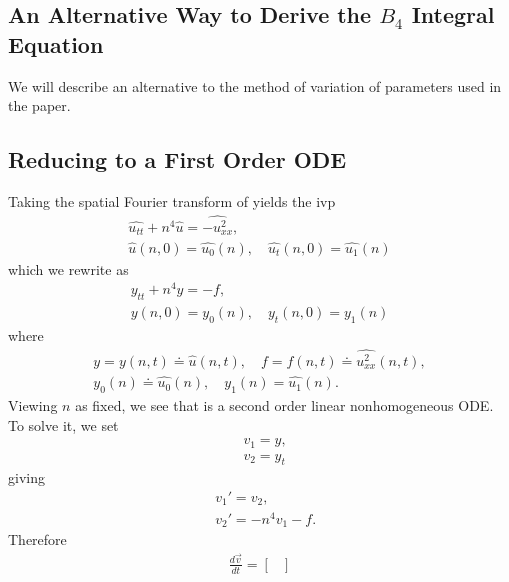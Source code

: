 \documentclass[12pt,reqno]{amsart}
\numberwithin{equation}{section}  %
\renewcommand{\cref}{\Cref}
\newcommand{\wh}{\widehat}
\begin{document}
\begin{appendices}
\section{An Alternative Way to Derive the $B_{4}$ Integral Equation}
\label{ssec:integral-form-deriv}
We will describe an alternative to the method of variation of parameters used in
the paper. 
%
%
\subsection{Reducing to a First Order ODE} 
\label{ssec:first-order-ode}
Taking the spatial Fourier transform of \cref{lin-mb} yields
the ivp
%
%
\begin{gather*}
  \wh{u_{tt}} + n^{4} \wh{u} = \wh{-u^{2}_{xx}},
  \\
  \wh{u}(n, 0) = \wh{u_{0}}(n), \quad \wh{u_{t}}(n, 0) = \wh{u_{1}}(n)
\end{gather*}
%
%
which we rewrite as 
%
%
\begin{gather}
  \label{eqn:lin-mb-ode}
  y_{tt} + n^{4}y = -f,
  \\
  y(n, 0) = y_{0}(n), \quad y_{t}(n, 0) = y_{1}(n)
\label{eqn:lin-mb-ode-init-data}
\end{gather}
%
%
where
%
%
\begin{gather*}
  \label{not-1}
  y = y(n, t) \doteq \wh{u}(n, t), \quad f = f(n, t) \doteq
  \wh{u^{2}_{xx}}(n,t),
  \\
  \label{not-2}
  y_{0}(n) \doteq \wh{u_{0}}(n), \quad y_{1}(n) = \wh{u_{1}}(n).
\end{gather*}
%
%
Viewing $n$ as fixed, we see that \cref{eqn:lin-mb-ode} is a second order
linear nonhomogeneous ODE. To solve it, we set 
%
%
\begin{equation*}
  \label{not-3}
\begin{split}
   & v_{1} = y, 
   \\
   & v_{2} = y_{t}
\end{split}
\end{equation*}
%
%
giving
%
%
\begin{equation*}
\begin{split}
  & v_{1}' = v_{2},
  \\
  & v_{2}' = -n^{4}v_{1} - f.
\end{split}
\end{equation*}
%
%
Therefore 
%
%
\begin{equation}
\begin{split}
\frac{d \vec v}{dt} = 
\begin{bmatrix}

\end{bmatrix}
\end{split}
\end{equation}
\end{appendices}
\end{document}
